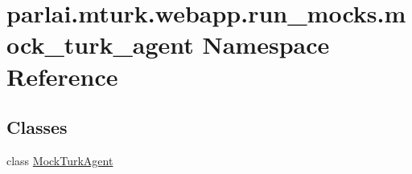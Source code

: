 \hypertarget{namespaceparlai_1_1mturk_1_1webapp_1_1run__mocks_1_1mock__turk__agent}{}\section{parlai.\+mturk.\+webapp.\+run\+\_\+mocks.\+mock\+\_\+turk\+\_\+agent Namespace Reference}
\label{namespaceparlai_1_1mturk_1_1webapp_1_1run__mocks_1_1mock__turk__agent}
\subsection*{Classes}
\begin{DoxyCompactItemize}
\item 
class \hyperlink{classparlai_1_1mturk_1_1webapp_1_1run__mocks_1_1mock__turk__agent_1_1MockTurkAgent}{Mock\+Turk\+Agent}
\end{DoxyCompactItemize}

